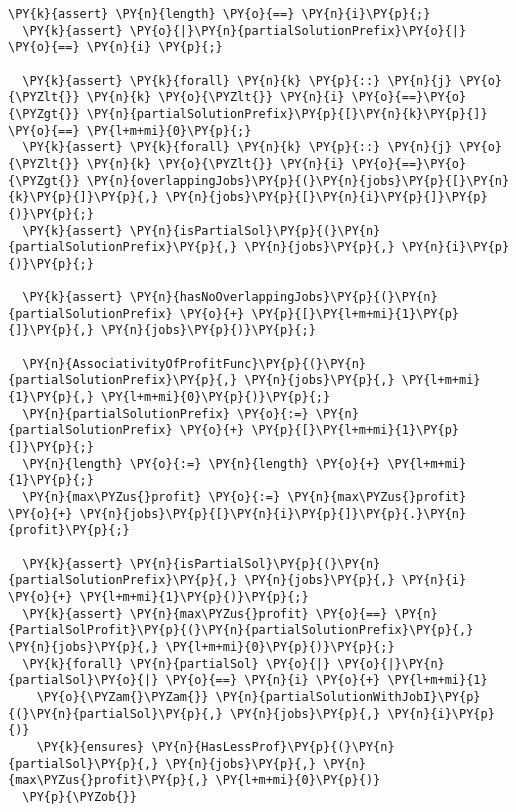 \begin{Verbatim}[commandchars=\\\{\}, fontsize=\small]
  \PY{k}{assert} \PY{n}{length} \PY{o}{==} \PY{n}{i}\PY{p}{;}
  \PY{k}{assert} \PY{o}{|}\PY{n}{partialSolutionPrefix}\PY{o}{|} \PY{o}{==} \PY{n}{i} \PY{p}{;}

  \PY{k}{assert} \PY{k}{forall} \PY{n}{k} \PY{p}{::} \PY{n}{j} \PY{o}{\PYZlt{}} \PY{n}{k} \PY{o}{\PYZlt{}} \PY{n}{i} \PY{o}{==}\PY{o}{\PYZgt{}} \PY{n}{partialSolutionPrefix}\PY{p}{[}\PY{n}{k}\PY{p}{]} \PY{o}{==} \PY{l+m+mi}{0}\PY{p}{;}
  \PY{k}{assert} \PY{k}{forall} \PY{n}{k} \PY{p}{::} \PY{n}{j} \PY{o}{\PYZlt{}} \PY{n}{k} \PY{o}{\PYZlt{}} \PY{n}{i} \PY{o}{==}\PY{o}{\PYZgt{}} \PY{n}{overlappingJobs}\PY{p}{(}\PY{n}{jobs}\PY{p}{[}\PY{n}{k}\PY{p}{]}\PY{p}{,} \PY{n}{jobs}\PY{p}{[}\PY{n}{i}\PY{p}{]}\PY{p}{)}\PY{p}{;} 
  \PY{k}{assert} \PY{n}{isPartialSol}\PY{p}{(}\PY{n}{partialSolutionPrefix}\PY{p}{,} \PY{n}{jobs}\PY{p}{,} \PY{n}{i}\PY{p}{)}\PY{p}{;}

  \PY{k}{assert} \PY{n}{hasNoOverlappingJobs}\PY{p}{(}\PY{n}{partialSolutionPrefix} \PY{o}{+} \PY{p}{[}\PY{l+m+mi}{1}\PY{p}{]}\PY{p}{,} \PY{n}{jobs}\PY{p}{)}\PY{p}{;} 

  \PY{n}{AssociativityOfProfitFunc}\PY{p}{(}\PY{n}{partialSolutionPrefix}\PY{p}{,} \PY{n}{jobs}\PY{p}{,} \PY{l+m+mi}{1}\PY{p}{,} \PY{l+m+mi}{0}\PY{p}{)}\PY{p}{;} 
  \PY{n}{partialSolutionPrefix} \PY{o}{:=} \PY{n}{partialSolutionPrefix} \PY{o}{+} \PY{p}{[}\PY{l+m+mi}{1}\PY{p}{]}\PY{p}{;}
  \PY{n}{length} \PY{o}{:=} \PY{n}{length} \PY{o}{+} \PY{l+m+mi}{1}\PY{p}{;}
  \PY{n}{max\PYZus{}profit} \PY{o}{:=} \PY{n}{max\PYZus{}profit} \PY{o}{+} \PY{n}{jobs}\PY{p}{[}\PY{n}{i}\PY{p}{]}\PY{p}{.}\PY{n}{profit}\PY{p}{;}

  \PY{k}{assert} \PY{n}{isPartialSol}\PY{p}{(}\PY{n}{partialSolutionPrefix}\PY{p}{,} \PY{n}{jobs}\PY{p}{,} \PY{n}{i} \PY{o}{+} \PY{l+m+mi}{1}\PY{p}{)}\PY{p}{;}
  \PY{k}{assert} \PY{n}{max\PYZus{}profit} \PY{o}{==} \PY{n}{PartialSolProfit}\PY{p}{(}\PY{n}{partialSolutionPrefix}\PY{p}{,} \PY{n}{jobs}\PY{p}{,} \PY{l+m+mi}{0}\PY{p}{)}\PY{p}{;}
  \PY{k}{forall} \PY{n}{partialSol} \PY{o}{|} \PY{o}{|}\PY{n}{partialSol}\PY{o}{|} \PY{o}{==} \PY{n}{i} \PY{o}{+} \PY{l+m+mi}{1} 
    \PY{o}{\PYZam{}\PYZam{}} \PY{n}{partialSolutionWithJobI}\PY{p}{(}\PY{n}{partialSol}\PY{p}{,} \PY{n}{jobs}\PY{p}{,} \PY{n}{i}\PY{p}{)}
    \PY{k}{ensures} \PY{n}{HasLessProf}\PY{p}{(}\PY{n}{partialSol}\PY{p}{,} \PY{n}{jobs}\PY{p}{,} \PY{n}{max\PYZus{}profit}\PY{p}{,} \PY{l+m+mi}{0}\PY{p}{)}
  \PY{p}{\PYZob{}}
   

\end{Verbatim}

